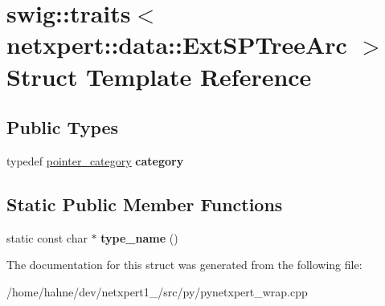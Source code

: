 \hypertarget{structswig_1_1traits_3_01netxpert_1_1data_1_1ExtSPTreeArc_01_4}{}\section{swig\+:\+:traits$<$ netxpert\+:\+:data\+:\+:Ext\+S\+P\+Tree\+Arc $>$ Struct Template Reference}
\label{structswig_1_1traits_3_01netxpert_1_1data_1_1ExtSPTreeArc_01_4}
\subsection*{Public Types}
\begin{DoxyCompactItemize}
\item 
typedef \hyperlink{structswig_1_1pointer__category}{pointer\+\_\+category} {\bfseries category}\hypertarget{structswig_1_1traits_3_01netxpert_1_1data_1_1ExtSPTreeArc_01_4_a4c0c01c926a7e28775db1d4df03c37eb}{}\label{structswig_1_1traits_3_01netxpert_1_1data_1_1ExtSPTreeArc_01_4_a4c0c01c926a7e28775db1d4df03c37eb}

\end{DoxyCompactItemize}
\subsection*{Static Public Member Functions}
\begin{DoxyCompactItemize}
\item 
static const char $\ast$ {\bfseries type\+\_\+name} ()\hypertarget{structswig_1_1traits_3_01netxpert_1_1data_1_1ExtSPTreeArc_01_4_a59c3b3c5ea6fcba543a66034bb0ceae9}{}\label{structswig_1_1traits_3_01netxpert_1_1data_1_1ExtSPTreeArc_01_4_a59c3b3c5ea6fcba543a66034bb0ceae9}

\end{DoxyCompactItemize}


The documentation for this struct was generated from the following file\+:\begin{DoxyCompactItemize}
\item 
/home/hahne/dev/netxpert1\+\_/src/py/pynetxpert\+\_\+wrap.\+cpp\end{DoxyCompactItemize}
